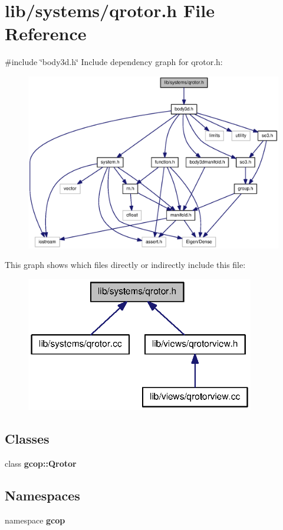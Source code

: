 \section{lib/systems/qrotor.h \-File \-Reference}
\label{qrotor_8h}
{\ttfamily \#include \char`\"{}body3d.\-h\char`\"{}}\*
\-Include dependency graph for qrotor.\-h\-:
\nopagebreak
\begin{figure}[H]
\begin{center}
\leavevmode
\includegraphics[width=350pt]{qrotor_8h__incl}
\end{center}
\end{figure}
\-This graph shows which files directly or indirectly include this file\-:
\nopagebreak
\begin{figure}[H]
\begin{center}
\leavevmode
\includegraphics[width=283pt]{qrotor_8h__dep__incl}
\end{center}
\end{figure}
\subsection*{\-Classes}
\begin{DoxyCompactItemize}
\item 
class {\bf gcop\-::\-Qrotor}
\end{DoxyCompactItemize}
\subsection*{\-Namespaces}
\begin{DoxyCompactItemize}
\item 
namespace {\bf gcop}
\end{DoxyCompactItemize}
